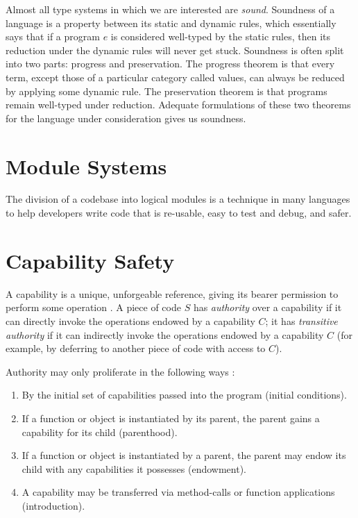 Almost all type systems in which we are interested are \textit{sound}. Soundness of a language is a property between its static and dynamic rules, which essentially says that if a program $e$ is considered well-typed by the static rules, then its reduction under the dynamic rules will never get stuck. Soundness is often split into two parts: progress and preservation. The progress theorem is that every term, except those of a particular category called values, can always be reduced by applying some dynamic rule. The preservation theorem is that programs remain well-typed under reduction. Adequate formulations of these two theorems for the language under consideration gives us soundness. 

\section{Module Systems}

The division of a codebase into logical modules is a technique in many languages to help developers write code that is re-usable, easy to test and debug, and safer. 

\section{Capability Safety}

A capability is a unique, unforgeable reference, giving its bearer permission to perform some operation \cite{dennis66}. A piece of code $S$ has \textit{authority} over a capability if it can directly invoke the operations endowed by a capability $C$; it has \textit{transitive authority} if it can indirectly invoke the operations endowed by a capability $C$ (for example, by deferring to another piece of code with access to $C$).

Authority may only proliferate in the following ways \cite{miller06}:

\begin{enumerate}
	\item By the initial set of capabilities passed into the program (initial conditions).
	\item If a function or object is instantiated by its parent, the parent gains a capability for its child (parenthood).
	\item If a function or object is instantiated by a parent, the parent may endow its child with any capabilities it possesses (endowment).
	\item A capability may be transferred via method-calls or function applications (introduction).
\end{enumerate}

